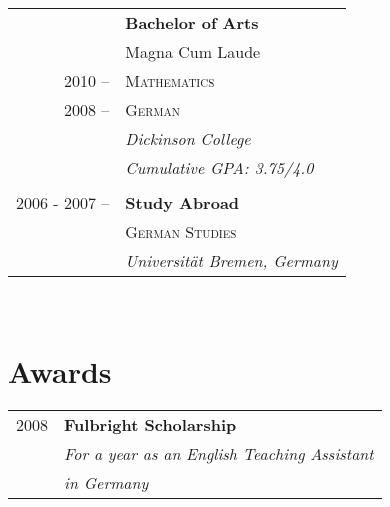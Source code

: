 \documentclass[10pt]{article} %
\begin{document}
{\begin{minipage}[t]{0.44\textwidth}
\begin{tabular}{rl}

& \textbf{Bachelor of Arts} \\ 
& \small Magna Cum Laude\\
2010 -- & \textsc{Mathematics} \\ 
2008 -- & \textsc{German} \\ 
& \textit{Dickinson College}\\
& \textit{Cumulative GPA: 3.75/4.0}\\
&\\
	 

2006 - 2007 -- & \textbf{Study Abroad}\\
& \textsc{German Studies} \\
& \textit{Universit\"at Bremen, Germany} 
	

\end{tabular}\\[10pt]


\section{Awards} 

\begin{tabular}{rl}
2008	 & \textbf{Fulbright Scholarship}\\
& \textit{For a year as an English Teaching Assistant}\\
& \textit{in Germany}\\



\end{tabular}
\end{minipage}}
\end{document}
